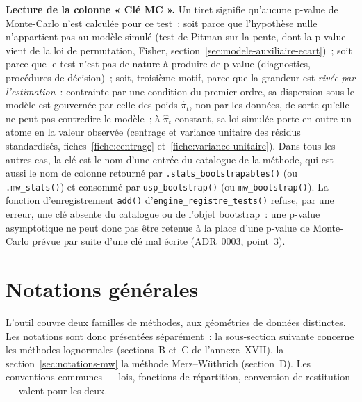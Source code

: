 \documentclass[a4paper,11pt]{article}
\newcommand{\code}[1]{\texttt{\small #1}}
\begin{document}
\begin{encadre}
\textbf{Lecture de la colonne « Clé MC ».} Un tiret signifie qu'aucune p-value
de Monte-Carlo n'est calculée pour ce test~: soit parce que l'hypothèse nulle
n'appartient pas au modèle simulé (test de Pitman sur la pente, dont la p-value vient de la loi de
permutation, Fisher, section~\ref{sec:modele-auxiliaire-ecart})~; soit parce
que le test n'est pas de nature à produire de p-value (diagnostics, procédures
de décision)~; soit, troisième motif, parce que la
grandeur est \emph{rivée par l'estimation}~: contrainte par une condition du
premier ordre, sa dispersion sous le modèle est gouvernée par celle des poids
$\hat\pi_t$, non par les données, de sorte qu'elle ne peut pas contredire le
modèle~; à $\hat\pi_t$ constant, sa loi simulée porte en outre un atome en la
valeur observée (centrage et variance unitaire des résidus
standardisés, fiches~\ref{fiche:centrage} et~\ref{fiche:variance-unitaire}). Dans tous les autres cas, la clé
est le nom d'une entrée du catalogue de la méthode, qui est aussi le nom de colonne retourné
par \code{.stats\_bootstrapables()} (ou \code{.mw\_stats()}) et consommé par
\code{usp\_bootstrap()} (ou \code{mw\_bootstrap()}). La fonction d'enregistrement
\code{add()} d'\code{engine\_registre\_tests()} refuse, par une erreur, une clé absente du
catalogue ou de l'objet bootstrap~: une p-value asymptotique ne peut donc pas être retenue à la
place d'une p-value de Monte-Carlo prévue par suite d'une clé mal écrite (ADR~0003, point~3).
\end{encadre}


\newpage
\clearpage
\section{Notations générales}
\label{sec:notations}

L'outil couvre deux familles de méthodes, aux géométries de données distinctes.
Les notations sont donc présentées séparément~: la sous-section suivante concerne
les méthodes lognormales (sections~B et~C de l'annexe~XVII), la
section~\ref{sec:notations-mw} la méthode Merz--Wüthrich (section~D). Les
conventions communes --- lois, fonctions de répartition, convention de
restitution --- valent pour les deux.
\end{document}
